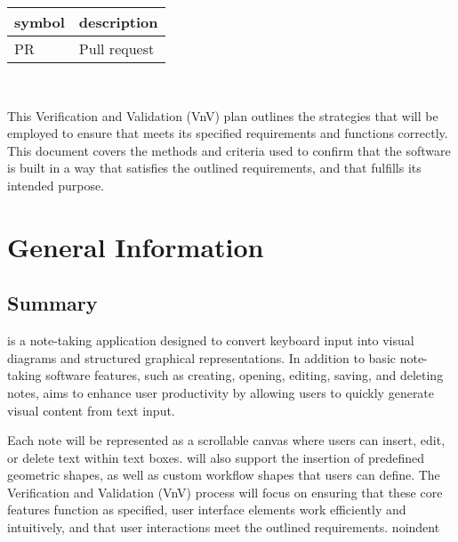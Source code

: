 \documentclass[12pt, titlepage]{article}
\begin{document}
\renewcommand{\arraystretch}{1.2}
\begin{tabular}{l l}
  \toprule
  \textbf{symbol} & \textbf{description}\\
  \midrule
  PR & Pull request\\
  \bottomrule
\end{tabular}\\



\newpage


\noindent This Verification and Validation (VnV) plan outlines the strategies that
will be employed to ensure that \progname{} meets its specified requirements
and functions correctly. This document covers the methods and criteria used
to confirm that the software is built in a way that satisfies the outlined
requirements, and that fulfills its intended purpose.


\section{General Information}

\subsection{Summary}


\progname{} is a note-taking application designed to convert keyboard input into
visual diagrams and structured graphical representations. In addition to basic
note-taking software features, such as creating, opening, editing, saving, and
deleting notes, \progname{} aims to enhance user productivity by allowing users
to quickly generate visual content from text input.

\vspace{1em}

\noindent Each note will be represented as a scrollable canvas where users can insert,
edit, or delete text within text boxes. \progname{} will also support the insertion of
predefined geometric shapes, as well as custom workflow shapes that users can
define. The Verification and Validation (VnV) process will focus on ensuring
that these core features function as specified, user interface elements work
efficiently and intuitively, and that user interactions meet the outlined
requirements.
noindent
\end{document}
